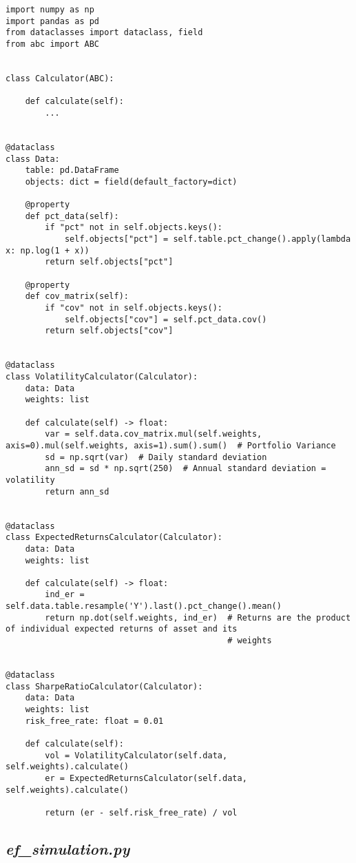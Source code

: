 \documentclass[12pt,a4paper,twoside,openany]{book}
\begin{document}
\begin{verbatim}
import numpy as np
import pandas as pd
from dataclasses import dataclass, field
from abc import ABC


class Calculator(ABC):

    def calculate(self):
        ...


@dataclass
class Data:
    table: pd.DataFrame
    objects: dict = field(default_factory=dict)

    @property
    def pct_data(self):
        if "pct" not in self.objects.keys():
            self.objects["pct"] = self.table.pct_change().apply(lambda x: np.log(1 + x))
        return self.objects["pct"]

    @property
    def cov_matrix(self):
        if "cov" not in self.objects.keys():
            self.objects["cov"] = self.pct_data.cov()
        return self.objects["cov"]


@dataclass
class VolatilityCalculator(Calculator):
    data: Data
    weights: list

    def calculate(self) -> float:
        var = self.data.cov_matrix.mul(self.weights, axis=0).mul(self.weights, axis=1).sum().sum()  # Portfolio Variance
        sd = np.sqrt(var)  # Daily standard deviation
        ann_sd = sd * np.sqrt(250)  # Annual standard deviation = volatility
        return ann_sd


@dataclass
class ExpectedReturnsCalculator(Calculator):
    data: Data
    weights: list

    def calculate(self) -> float:
        ind_er = self.data.table.resample('Y').last().pct_change().mean()
        return np.dot(self.weights, ind_er)  # Returns are the product of individual expected returns of asset and its
                                             # weights


@dataclass
class SharpeRatioCalculator(Calculator):
    data: Data
    weights: list
    risk_free_rate: float = 0.01

    def calculate(self):
        vol = VolatilityCalculator(self.data, self.weights).calculate()
        er = ExpectedReturnsCalculator(self.data, self.weights).calculate()

        return (er - self.risk_free_rate) / vol

\end{verbatim}


\subsection*{\textit{ef\_simulation.py}}
\end{document}
